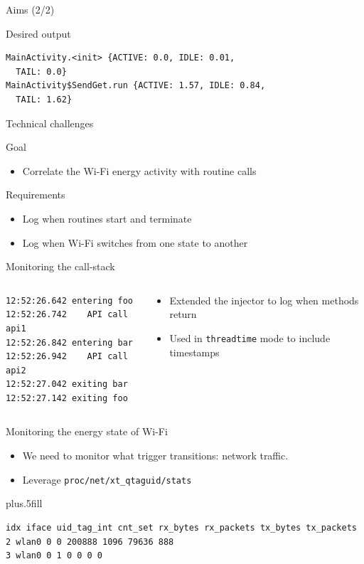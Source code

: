 %
%
\begin{frame}[fragile]{Aims (2/2)}
\begin{block}{Desired output}
\begin{lstlisting}
MainActivity.<init> {ACTIVE: 0.0, IDLE: 0.01,
  TAIL: 0.0}
MainActivity$SendGet.run {ACTIVE: 1.57, IDLE: 0.84,
  TAIL: 1.62}
\end{lstlisting}
\end{block}         
\end{frame}
%
%
\begin{frame}{Technical challenges}
\begin{block}{Goal}
\begin{itemize}
\item \alert{Correlate} the Wi-Fi energy activity with routine calls
\end{itemize}
\end{block}
\begin{block}{Requirements}
\begin{itemize}
\item Log when routines start and terminate
\item Log when Wi-Fi switches from one state to another
\end{itemize}
\end{block}
\end{frame}
%
%
\begin{frame}[fragile]{Monitoring the call-stack}
\begin{columns}
\begin{column}{0.6\textwidth}
\begin{lstlisting}
12:52:26.642 entering foo
12:52:26.742 	API call api1
12:52:26.842 entering bar
12:52:26.942 	API call api2
12:52:27.042 exiting bar
12:52:27.142 exiting foo
\end{lstlisting}
\end{column}
\begin{column}{0.4\textwidth}
\begin{itemize}
\item Extended the injector to \alert{log when methods return}
\item Used \logcat{} in \texttt{threadtime} mode to \alert{include timestamps}
\end{itemize}
\end{column}
\end{columns}
\end{frame}
%
%
\begin{frame}[fragile]{Monitoring the energy state of Wi-Fi}
\begin{itemize}
\item We need to monitor what trigger transitions: \alert{network traffic}.
\item Leverage \texttt{proc/net/xt\_qtaguid/stats}
\end{itemize}
\vskip0pt plus.5fill
\begin{lstlisting}
idx iface uid_tag_int cnt_set rx_bytes rx_packets tx_bytes tx_packets
2 wlan0 0 0 200888 1096 79636 888
3 wlan0 0 1 0 0 0 0
\end{lstlisting}
\end{frame}
